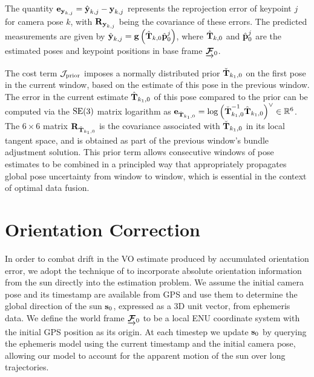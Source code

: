 The quantity $\boldsymbol{\mathbf{e}}_{\boldsymbol{\mathbf{y}}_{k,j}} = \hat{\boldsymbol{\mathbf{y}}}_{k,j} - \boldsymbol{\mathbf{y}}_{k,j}$ represents the reprojection error of keypoint $j$ for camera pose $k$, with $\boldsymbol{\mathbf{R}}_{\boldsymbol{\mathbf{y}}_{k,j}}$ being the covariance of these errors.
The predicted measurements are given by $\hat{\boldsymbol{\mathbf{y}}}_{k,j} = \boldsymbol{\mathbf{g}}\left(\hat{\boldsymbol{\mathbf{T}}}_{k,0} \hat{\boldsymbol{\mathbf{p}}}^j_{0}\right)$, where $\hat{\boldsymbol{\mathbf{T}}}_{k,0}$ and $\hat{\boldsymbol{\mathbf{p}}}^j_{0}$ are the estimated poses and keypoint positions in base frame $\underrightarrow{ \boldsymbol{\mathbf{\mathcal{F}}} }_{0}$.

The cost term $\mathcal{J}_\text{prior}$ imposes a normally distributed prior $\check{\boldsymbol{\mathbf{T}}}_{k_1,0}$ on the first pose in the current window, based on the estimate of this pose in the previous window.
The error in the current estimate $\hat{\boldsymbol{\mathbf{T}}}_{k_1,0}$ of this pose compared to the prior can be computed via the $\mathrm{SE}(3)$ matrix logarithm as $\boldsymbol{\mathbf{e}}_{\check{\boldsymbol{\mathbf{T}}}_{k_1,0}} = \log \left( \check{\boldsymbol{\mathbf{T}}}_{k_1,0}^{-1} \hat{\boldsymbol{\mathbf{T}}}_{k_1,0} \right)^\vee \in \mathbb{R}^6$.
The $6 \times 6$ matrix $\boldsymbol{\mathbf{R}}_{\check{\boldsymbol{\mathbf{T}}}_{k_1,0}}$ is the covariance associated with $\check{\boldsymbol{\mathbf{T}}}_{k_1,0}$ in its local tangent space, and is obtained as part of the previous window's bundle adjustment solution.
This prior term allows consecutive windows of pose estimates to be combined in a principled way that appropriately propagates global pose uncertainty from window to window, which is essential in the context of optimal data fusion.

\section{Orientation Correction}
In order to combat drift in the VO estimate produced by accumulated orientation error, we adopt the technique of \citet{Lambert2012-sn} to incorporate absolute orientation information from the sun directly into the estimation problem.
We assume the initial camera pose and its timestamp are available from GPS and use them to determine the global direction of the sun $\boldsymbol{\mathbf{s}}_0$, expressed as a 3D unit vector, from ephemeris data.
We define the world frame $\underrightarrow{ \boldsymbol{\mathbf{\mathcal{F}}} }_{0}$ to be a local ENU coordinate system with the initial GPS position as its origin.
At each timestep we update $\boldsymbol{\mathbf{s}}_0$ by querying the ephemeris model using the current timestamp and the initial camera pose, allowing our model to account for the apparent motion of the sun over long trajectories.

